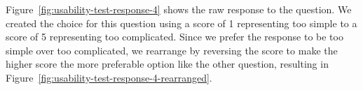 \documentclass[12pt,oneside,openright,a4paper]{cpe-english-project}
\begin{document}
\begin{minipage}[c]{\textwidth}\centering {}  \label{fig:usability-test-response-4} \end{minipage}
Figure~\ref{fig:usability-test-response-4} shows the raw response to the question. We created the choice for this question using a score of 1 representing too simple to a score of 5 representing too complicated. Since we prefer the response to be too simple over too complicated, we rearrange by reversing the score to make the higher score the more preferable option like the other question, resulting in Figure~\ref{fig:usability-test-response-4-rearranged}.
\end{document}
